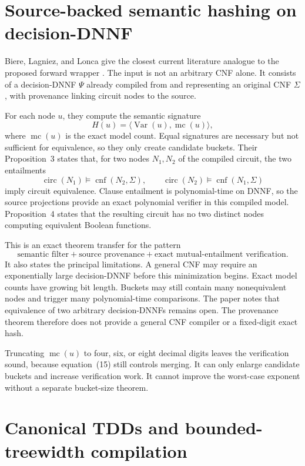 \documentclass[11pt]{article}
\newcommand{\mc}{\operatorname{mc}}
\newcommand{\Var}{\operatorname{Var}}
\begin{document}
\section{Source-backed semantic hashing on decision-DNNF}

Biere, Lagniez, and Lonca give the closest current literature analogue to the
proposed forward wrapper \cite{biere2026}.  The input is not an arbitrary CNF
alone.  It consists of a decision-DNNF $\Psi$ already compiled from and
representing an original CNF $\Sigma$, with provenance linking circuit nodes
to the source.

For each node $u$, they compute the semantic signature
\[
 H(u)=\langle\Var(u),\mc(u)\rangle,
 \tag{14}
\]
where $\mc(u)$ is the exact model count.  Equal signatures are necessary but
not sufficient for equivalence, so they only create candidate buckets.
Their Proposition~3 states that, for two nodes $N_1,N_2$ of the compiled
circuit, the two entailments
\[
 \operatorname{circ}(N_1)\models\operatorname{cnf}(N_2,\Sigma),
 \qquad
 \operatorname{circ}(N_2)\models\operatorname{cnf}(N_1,\Sigma)
 \tag{15}
\]
imply circuit equivalence.  Clause entailment is polynomial-time on DNNF, so
the source projections provide an exact polynomial verifier in this compiled
model.  Proposition~4 states that the resulting circuit has no two distinct
nodes computing equivalent Boolean functions.

This is an exact theorem transfer for the pattern
\[
 \boxed{\text{semantic filter} + \text{source provenance}
        + \text{exact mutual-entailment verification}.}
 \tag{16}
\]
It also states the principal limitations.  A general CNF may require an
exponentially large decision-DNNF before this minimization begins.  Exact
model counts have growing bit length.  Buckets may still contain many
nonequivalent nodes and trigger many polynomial-time comparisons.  The paper
notes that equivalence of two arbitrary decision-DNNFs remains open.  The
provenance theorem therefore does not provide a general CNF compiler or a
fixed-digit exact hash.

Truncating $\mc(u)$ to four, six, or eight decimal digits leaves the
verification sound, because equation~(15) still controls merging.  It can
only enlarge candidate buckets and increase verification work.  It cannot
improve the worst-case exponent without a separate bucket-size theorem.

\section{Canonical TDDs and bounded-treewidth compilation}
\end{document}
